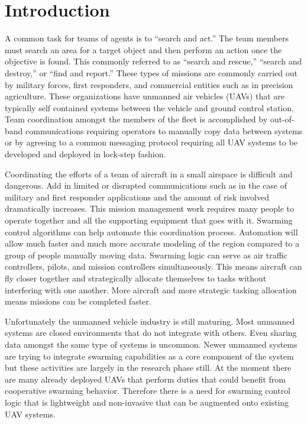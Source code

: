 \chapter{Introduction}
A common task for teams of agents is to ``search and act.''  The team members must search an area for a target object and then perform an action once the objective is found.  This commonly referred to as ``search and rescue,'' ``search and destroy,'' or ``find and report.''  These types of missions are commonly carried out by military forces, first responders, and commercial entities such as in precision agriculture.  These organizations have unmanned air vehicles (UAVs) that are typically self contained systems between the vehicle and ground control station.  Team coordination amongst the members of the fleet is accomplished by out-of-band communications requiring operators to manually copy data between systems or by agreeing to a common messaging protocol requiring all UAV systems to be developed and deployed in lock-step fashion.  

Coordinating the efforts of a team of aircraft in a small airspace is difficult and dangerous.  Add in limited or disrupted communications such as in the case of military and first responder applications and the amount of risk involved dramatically increases.  This mission management work requires many people to operate together and all the supporting equipment that goes with it. Swarming control algorithms can help automate this coordination process.  Automation will allow much faster and much more accurate modeling of the region compared to a group of people manually moving data.  Swarming logic can serve as air traffic controllers, pilots, and mission controllers simultaneously.  This means aircraft can fly closer together and strategically allocate themselves to tasks without interfering with one another.  More aircraft and more strategic tasking allocation means missions can be completed faster.

Unfortunately the unmanned vehicle industry is still maturing.  Most unmanned systems are closed environments that do not integrate with others.  Even sharing data amongst the same type of systems is uncommon.  Newer unmanned systems are trying to integrate swarming capabilities as a core component of the system but these activities are largely in the research phase still.  At the moment there are many already deployed UAVs that perform duties that could benefit from cooperative swarming behavior.  Therefore there is a need for swarming control logic that is lightweight and non-invasive that can be augmented onto existing UAV systems.

